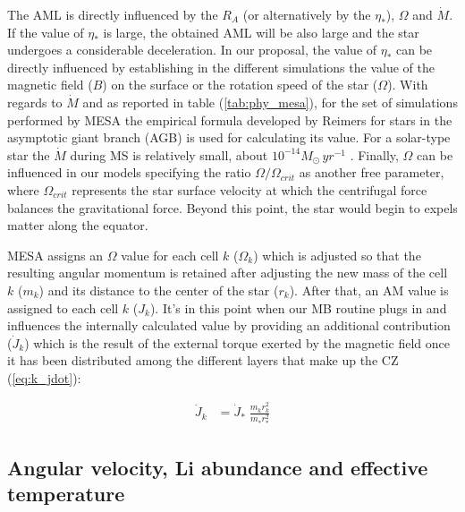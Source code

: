 \documentclass[fleqn,usenatbib]{mnras}
\begin{document}
The AML is directly influenced by the $R_A$ (or alternatively by the $\eta_*$), $\Omega$ and $\Dot{M}$. If the value of $\eta_*$ is large, the obtained AML will be also large and the star undergoes a considerable deceleration. In our proposal, the value of $\eta_*$ can be directly influenced by establishing in the different simulations the value of the magnetic field ($B$) on the surface or the rotation speed of the star ($\Omega$). With regards to $\Dot{M}$ and as reported in table (\ref{tab:phy_mesa}), for the set of simulations performed by MESA the empirical formula developed by Reimers \citet{Reimers1975} for stars in the asymptotic giant branch (AGB) is used for calculating its value. For a solar-type star the $\Dot{M}$ during MS is relatively small, about  $10^{-14}M_{\odot} \, yr^{-1}$ \citet{Noerdlinger2008}. Finally, $\Omega$ can be influenced in our models specifying the ratio $\Omega / \Omega_{crit}$ as another free parameter, where  $\Omega_{crit}$ represents the star surface velocity at which the centrifugal force balances  the gravitational force. Beyond this point, the star would begin to expels matter along the equator.\par

MESA assigns an $\Omega$ value for each cell $k$ ($\Omega_k$) which is adjusted so that the resulting angular momentum is retained after adjusting the new mass of the cell $k$ ($m_k$) and its distance to the center of the star ($r_k$). After that, an AM value is assigned to each cell $k$ ($J_k$). It's in this point when our MB routine plugs in and influences the internally calculated value by providing an additional contribution ($\Dot{J}_{k}$) which is the result of the external torque exerted by the magnetic field once it has been distributed among the different layers that make up the CZ (\ref{eq:k_jdot}):\par
 
\begin{ceqn}
\begin{align}
    \Dot{J}_{k} &= \Dot{J}_*\;\frac{m^{}_{k} r^2_{k}}{m^{}_* r_*^2} \label{eq:k_jdot}
\end{align}
\end{ceqn}


\subsection{Angular velocity, Li abundance and effective temperature}
\end{document}

